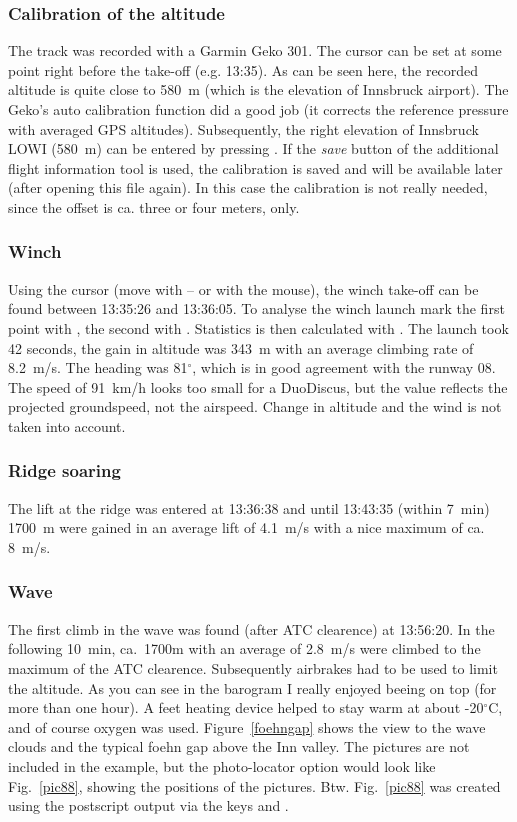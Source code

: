 \subsubsection{Calibration of the altitude}
The track was recorded with a Garmin Geko 301.
The cursor can be set at some point right before the take-off (e.g. 13:35).
As can be seen here, the recorded altitude is quite close to 580~m (which is the elevation of Innsbruck airport). The Geko's
auto calibration function did a good job (it corrects the reference pressure with averaged GPS altitudes).
Subsequently, the right elevation of Innsbruck LOWI (580~m) can be entered by pressing . If the \emph{save} button of the additional flight information tool is used, the calibration is saved and will be available later (after opening this file again). In this case the calibration is not really needed, since the offset is ca. three or four meters, only.

\subsubsection{Winch}
Using the cursor (move with -- or with the mouse), the winch take-off can be found between 13:35:26 and 13:36:05. To analyse the winch launch mark the first point with , the second with . Statistics is then calculated with .
The launch took 42 seconds, the gain in altitude was 343~m with an average climbing rate of 8.2~m/s. The heading was 81$^\circ$, which is in good agreement with the runway 08. The speed of 91~km/h looks too small for a DuoDiscus, but the value reflects the projected groundspeed, not the airspeed. Change in altitude and the wind is not taken into account.

\subsubsection{Ridge soaring}
The lift at the ridge was entered at 13:36:38 and until 13:43:35 (within 7~min) 1700~m were gained in an average lift of 4.1~m/s with a nice maximum of ca. 8~m/s.

\subsubsection{Wave}
The first climb in the wave was found (after ATC clearence) at 13:56:20. In the following 10~min, ca.~1700m with an average of 2.8~m/s were climbed to the maximum of the ATC clearence. Subsequently airbrakes had to be used to limit the altitude.
As you can see in the barogram I really enjoyed beeing on top (for more than one hour). A feet heating device helped to stay warm at about -20$^\circ$C, and of course oxygen was used. Figure~\ref{foehngap} shows the view to the wave clouds and the typical foehn gap above the Inn valley.
The pictures are not included in the example, but the photo-locator option would look like Fig.~\ref{pic88}, showing the positions of the pictures. Btw. Fig.~\ref{pic88} was created using the postscript output via the keys  and .

